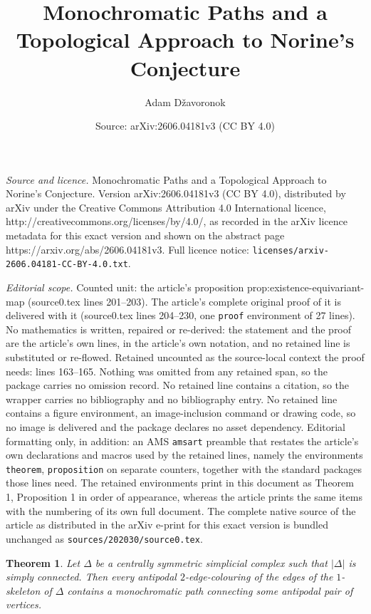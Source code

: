 \documentclass[10pt,a4paper]{amsart}
\title{Monochromatic Paths and a Topological Approach to Norine's Conjecture}
\author{Adam D\v{z}avoronok}
\date{Source: arXiv:2606.04181v3 (CC BY 4.0)}
\newtheorem{theorem}{Theorem}
\begin{document}
\maketitle

\noindent\emph{Source and licence.} Monochromatic Paths and a Topological Approach to Norine's Conjecture. Version arXiv:2606.04181v3 (CC BY 4.0), distributed by arXiv under the Creative Commons Attribution 4.0 International licence, http://creativecommons.org/licenses/by/4.0/, as recorded in the arXiv licence metadata for this exact version and shown on the abstract page https://arxiv.org/abs/2606.04181v3. Full licence notice: \texttt{licenses/arxiv-2606.04181-CC-BY-4.0.txt}.\par\smallskip

\noindent\textit{Editorial scope.} Counted unit: the article's proposition prop:existence-equivariant-map (source0.tex lines 201--203). The article's complete original proof of it is delivered with it (source0.tex lines 204--230, one \texttt{proof} environment of 27 lines). No mathematics is written, repaired or re-derived: the statement and the proof are the article's own lines, in the article's own notation, and no retained line is substituted or re-flowed.  Retained uncounted as the source-local context the proof needs: lines 163--165.  Nothing was omitted from any retained span, so the package carries no omission record.  No retained line contains a citation, so the wrapper carries no bibliography and no bibliography entry.  No retained line contains a figure environment, an image-inclusion command or drawing code, so no image is delivered and the package declares no asset dependency.  Editorial formatting only, in addition: an AMS \texttt{amsart} preamble that restates the article's own declarations and macros used by the retained lines, namely the environments \texttt{theorem}, \texttt{proposition} on separate counters, together with the standard packages those lines need.  The retained environments print in this document as Theorem 1, Proposition 1 in order of appearance, whereas the article prints the same items with the numbering of its own full document.  The complete native source of the article as distributed in the arXiv e-print for this exact version is bundled unchanged as \texttt{sources/202030/source0.tex}.
\begin{theorem}\label{thm:triangulated_squares}
 Let \(\Delta\) be a centrally symmetric simplicial complex such that \(|\Delta|\) is simply connected. Then every antipodal \(2\)-edge-colouring of the edges of the \(1\)-skeleton of \(\Delta\) contains a monochromatic path connecting some antipodal pair of vertices.
\end{theorem}
\end{document}

